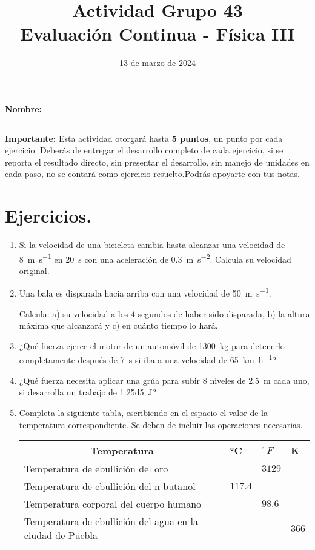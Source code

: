 \documentclass[14pt]{extarticle}
\title{\vspace*{-2cm} Actividad Grupo 43\\  Evaluación Continua - Física III\vspace{-5ex}}
\date{13 de marzo de 2024}
\begin{document}
\maketitle

\textbf{Nombre:} \rule{8cm}{0.1mm}

\vspace*{0.75cm}
\textbf{Importante: } Esta actividad otorgará hasta \textbf{5 puntos}, un punto por cada ejercicio. Deberás de entregar el desarrollo completo de cada ejercicio, si se reporta el resultado directo, sin presentar el desarrollo, sin manejo de unidades en cada paso, no se contará como ejercicio resuelto.Podrás apoyarte con tus notas.

\section{Ejercicios.}

\begin{enumerate}
\item Si la velocidad de una bicicleta cambia hasta alcanzar una velocidad de \SI{8}{\meter\per\second} en \SI{20}{\second} con una aceleración de \SI{0.3}{\meter\per\square\second}. Calcula su velocidad original.
\item Una bala es disparada hacia arriba con una velocidad de \SI{50}{\meter\per\second}. 

Calcula: a) su velocidad a los $4$ segundos de haber sido disparada, b) la altura máxima que alcanzará y c) en cuánto tiempo lo hará.
\item ¿Qué fuerza ejerce el motor de un automóvil de \SI{1300}{\kilo\gram} para detenerlo completamente después de \SI{7}{\second} si iba a una velocidad de \SI{65}{\kilo\meter\per\hour}?
\item ¿Qué fuerza necesita aplicar una grúa para subir $8$ niveles de \SI{2.5}{\meter} cada uno, si desarrolla un trabajo de \SI{1.25d5}{\joule}?
\item Completa la siguiente tabla, escribiendo en el espacio el valor de la temperatura correspondiente. Se deben de incluir las operaciones necesarias.
\begin{table}[H]
    \centering
    \begin{tabular}{| p{6.5cm} | >{\centering\arraybackslash}m{1.5cm} | >{\centering\arraybackslash}m{1.5cm} | >{\centering\arraybackslash}m{1.5cm} |} \hline
        \multicolumn{1}{|c|}{Temperatura} & \unit{\degreeCelsius} & ${}^{\circ} \, F$ & \unit{\kelvin} \\ \hline
        Temperatura de ebullición del oro & & $3129$ & \\ \hline
        Temperatura de ebullición del n-butanol & $117.4$ &  & \\ \hline
        Temperatura corporal del cuerpo humano & & $98.6$ & \\ \hline
        Temperatura de ebullición del agua en la ciudad de Puebla & & & $366$ \\ \hline
    \end{tabular}
\end{table}
\end{enumerate}
\end{document}
